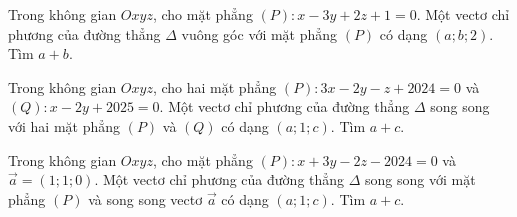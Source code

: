 \begin{ex}%
	Trong không gian $Oxyz$, cho mặt phẳng $(P) \colon x-3y+2z+1=0$.  Một vectơ chỉ phương của đường thẳng $\Delta $ vuông góc với mặt phẳng $\left( P \right)$ có dạng $(a;b;2)$. Tìm $a+b$.
\end{ex}


\begin{ex}%
	Trong không gian $Oxyz$, cho hai mặt phẳng $( P) \colon 3x-2y-z+2024=0$ và $(Q) \colon x-2y+2025=0$. Một vectơ chỉ phương của đường thẳng $\Delta $ song song với hai mặt phẳng $\left( P \right)$ và $\left( Q \right)$ có dạng $(a;1;c)$. Tìm $a+c$.
\end{ex}
\begin{ex}%
	Trong không gian $Oxyz$, cho mặt phẳng $(P) \colon x+3y-2z-2024=0$ và $\overrightarrow{a}=\left( 1;1;0 \right)$. Một vectơ chỉ phương của đường thẳng $\Delta $ song song với mặt phẳng $(P)$ và song song vectơ $\overrightarrow{a}$ có dạng $(a;1;c)$. Tìm $a+c$.
\end{ex}
